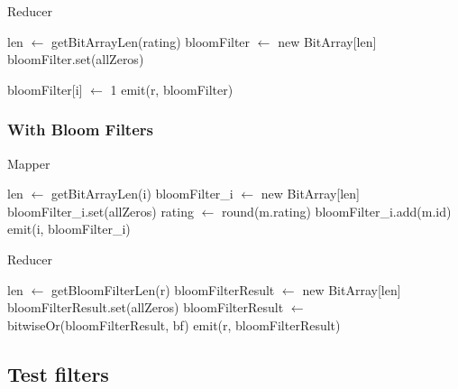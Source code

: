 \begin{algorithm}[H]
	\caption{Reducer} 
	\begin{algorithmic}[1]
		\State len $\gets$ getBitArrayLen(rating)
		\State bloomFilter $\gets$ new BitArray[len]
		\State bloomFilter.set(allZeros)
		
				\State bloomFilter[i] $\gets$ 1
			\EndFor
		\EndFor
		\State emit(r, bloomFilter)
		\EndProcedure
	\end{algorithmic} 
\end{algorithm}

\subsubsection{With Bloom Filters}

\begin{algorithm}[H]
	\caption{Mapper} 
	\begin{algorithmic}[1]
			\hfill {}
				\State len $\gets$ getBitArrayLen(i)
				\State bloomFilter\_i $\gets$ new BitArray[len]
				\State bloomFilter\_i.set(allZeros)
			\EndFor
				\State rating $\gets$ round(m.rating)
				\State bloomFilter\_i.add(m.id)
			\EndFor
				\State emit(i, bloomFilter\_i)			
			\EndFor
		\EndProcedure
	\end{algorithmic} 
\end{algorithm}

\begin{algorithm}[H]
	\caption{Reducer} 
	\begin{algorithmic}[1]
		\State len $\gets$ getBloomFilterLen(r)
		\State bloomFilterResult $\gets$ new BitArray[len]
		\State bloomFilterResult.set(allZeros)
			\State bloomFilterResult $\gets$ bitwiseOr(bloomFilterResult, bf)
		\EndFor
		\State emit(r, bloomFilterResult)
		\EndProcedure
	\end{algorithmic} 
\end{algorithm}

\subsection{Test filters}

